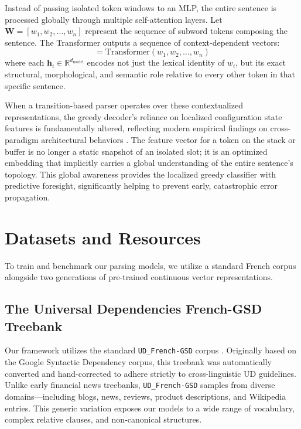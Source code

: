 \documentclass[12pt,a4paper]{article}
\begin{document}
Instead of passing isolated token windows to an MLP, the entire sentence is processed globally through multiple self-attention layers. Let $\mathbf{W} = [w_1, w_2, \dots, w_n]$ represent the sequence of subword tokens composing the sentence. The Transformer outputs a sequence of context-dependent vectors:
\begin{equation}
    [\mathbf{h}_1, \mathbf{h}_2, \dots, \mathbf{h}_n] = \text{Transformer}(w_1, w_2, \dots, w_n)
\end{equation}
where each $\mathbf{h}_i \in \mathbb{R}^{d_{\text{model}}}$ encodes not just the lexical identity of $w_i$, but its exact structural, morphological, and semantic role relative to every other token in that specific sentence.

When a transition-based parser operates over these contextualized representations, the greedy decoder's reliance on localized configuration state features is fundamentally altered, reflecting modern empirical findings on cross-paradigm architectural behaviors \cite{kulmizev2019}. The feature vector for a token on the stack or buffer is no longer a static snapshot of an isolated slot; it is an optimized embedding that implicitly carries a global understanding of the entire sentence's topology. This global awareness provides the localized greedy classifier with predictive foresight, significantly helping to prevent early, catastrophic error propagation.

\section{Datasets and Resources}
\label{sec:datasets_resources}

To train and benchmark our parsing models, we utilize a standard French corpus alongside two generations of pre-trained continuous vector representations.

\subsection{The Universal Dependencies French-GSD Treebank}
\label{subsec:resources_used}

Our framework utilizes the standard \texttt{UD\_French-GSD} corpus \cite{de2021universal, jurafsky2026speech}. Originally based on the Google Syntactic Dependency corpus, this treebank was automatically converted and hand-corrected to adhere strictly to cross-linguistic UD guidelines. Unlike early financial news treebanks, \texttt{UD\_French-GSD} samples from diverse domains—including blogs, news, reviews, product descriptions, and Wikipedia entries. This generic variation exposes our models to a wide range of vocabulary, complex relative clauses, and non-canonical structures.
\end{document}
